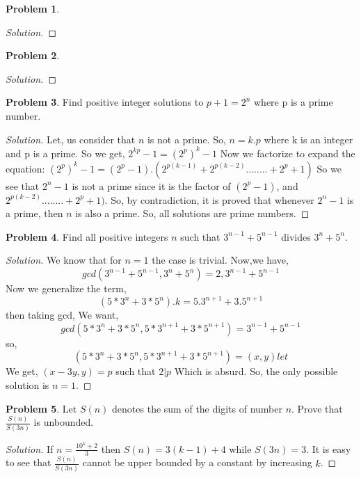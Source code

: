\documentclass[a4paper,oneside,12 pt]{book}
\theoremstyle{definition}
\theoremstyle{definition}
\newtheorem{prbm}{Problem}[section]
\theoremstyle{definition}
\begin{document}
\begin{prbm}
\begin{proof}[Solution]

\end{proof}
\end{prbm}



\begin{prbm}
\begin{proof}[Solution]

\end{proof}
\end{prbm}


\begin{prbm}
Find positive integer solutions to $p+1=2^n$ where p is a prime number.
\begin{proof}[Solution]
Let, us consider that $n$ is not a prime. So, $n=k.p$ where k is an integer and p is a prime.
So we get,
$2^{kp}-1=(2^p)^k-1$
Now we factorize to expand the equation:
$(2^p)^k-1=(2^p-1).(2^{p(k-1)}+2^{p(k-2)}........+2^p+1)$
So we see that $2^n - 1$ is not a prime since it is the factor of $(2^p-1)$, and $2^{p(k-2)}........+2^p+1)$. So, by contradiction, it is proved that whenever $2^n - 1$ is a prime, then $n$ is also a prime.
So, all solutions are prime numbers.
\end{proof}

\end{prbm}

\begin{prbm}
Find all positive integers $n$ such that $3^{n-1}+5^{n-1}$ divides $3^{n}+5^{n}$.
\begin{proof}[Solution]
We know that for $n=1$ the case is trivial.
Now,we have,
$$gcd(3^{n-1}+5^{n-1} ,3^{n}+5^{n})=2,3^{n-1}+5^{n-1}$$Now we generalize the term,
$$(5*3^n+3*5^n).k=5.3^{n+1}+3.5^{n+1}$$then taking gcd,
We want,
$$gcd(5*3^{n}+3*5^{n} ,5*3^{n+1}+3*5^{n+1})=3^{n-1}+5^{n-1}$$so,
$$(5*3^{n}+3*5^{n} ,5*3^{n+1}+3*5^{n+1})=(x,y)let$$We get,
$(x-3y,y)=p$ such that $2| p $
Which is absurd. So, the only possible solution is $n=1$.
\end{proof}

\end{prbm}

\begin{prbm}
Let $S(n)$ denotes the sum of the digits of number $n$. Prove that $\frac{S(n)}{S(3n)}$ is unbounded.
\begin{proof}[Solution]
If $n = \frac{10^k + 2}{3}$ then $S(n) = 3(k-1) + 4$ while $S(3n) = 3$. It is easy to see that $\frac{S(n)}{S(3n)}$ cannot be upper bounded by a constant by increasing $k$.
\end{proof}

\end{prbm}
\end{document}
